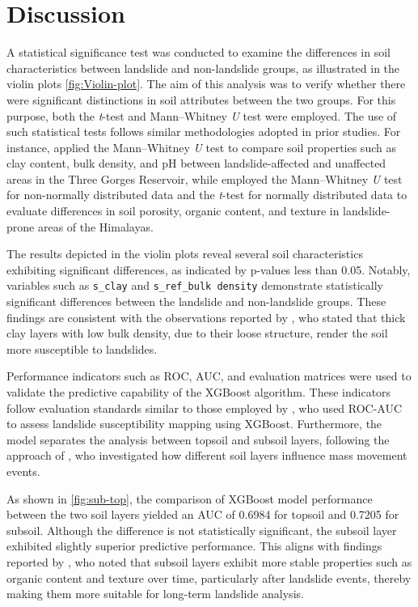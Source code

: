 \section{Discussion}

A statistical significance test was conducted to examine the differences in soil characteristics between landslide and non-landslide groups, as illustrated in the violin plots \ref{fig:Violin-plot}. The aim of this analysis was to verify whether there were significant distinctions in soil attributes between the two groups. For this purpose, both the \textit{t}-test and Mann–Whitney \textit{U} test were employed. The use of such statistical tests follows similar methodologies adopted in prior studies. For instance, \cite{disc01} applied the Mann–Whitney \textit{U} test to compare soil properties such as clay content, bulk density, and pH between landslide-affected and unaffected areas in the Three Gorges Reservoir, while \cite{disc02} employed the Mann–Whitney \textit{U} test for non-normally distributed data and the \textit{t}-test for normally distributed data to evaluate differences in soil porosity, organic content, and texture in landslide-prone areas of the Himalayas.

The results depicted in the violin plots reveal several soil characteristics exhibiting significant differences, as indicated by p-values less than 0.05. Notably, variables such as \texttt{s\_clay} and \texttt{s\_ref\_bulk density} demonstrate statistically significant differences between the landslide and non-landslide groups. These findings are consistent with the observations reported by \cite{disc03}, who stated that thick clay layers with low bulk density, due to their loose structure, render the soil more susceptible to landslides.

Performance indicators such as ROC, AUC, and evaluation matrices were used to validate the predictive capability of the XGBoost algorithm. These indicators follow evaluation standards similar to those employed by \cite{disc04}, who used ROC-AUC to assess landslide susceptibility mapping using XGBoost. Furthermore, the model separates the analysis between topsoil and subsoil layers, following the approach of \cite{disc05}, who investigated how different soil layers influence mass movement events.

As shown in \ref{fig:sub-top}, the comparison of XGBoost model performance between the two soil layers yielded an AUC of 0.6984 for topsoil and 0.7205 for subsoil. Although the difference is not statistically significant, the subsoil layer exhibited slightly superior predictive performance. This aligns with findings reported by \cite{disc06}, who noted that subsoil layers exhibit more stable properties such as organic content and texture over time, particularly after landslide events, thereby making them more suitable for long-term landslide analysis.

